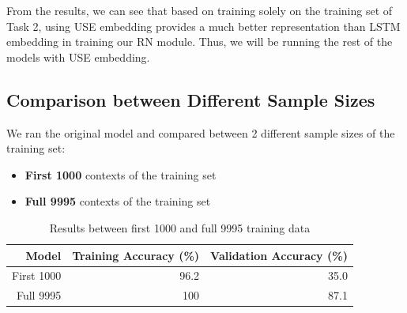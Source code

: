 \documentclass{article}
\begin{document}
From the results, we can see that based on training solely on the training set of Task 2, using USE embedding provides a much better representation than LSTM embedding in training our RN module. Thus, we will be running the rest of the models with USE embedding.

 

 

\subsection{Comparison between Different Sample Sizes}

 

 

We ran the original model and compared between 2 different sample sizes of the training set:

 

\begin{itemize}

\item  \textbf{First 1000} contexts of the training set

\item \textbf{Full 9995} contexts of the training set

\end{itemize}


\begin{table}[H] 

\begin{center}

\begin{tabular}{|r|r|r|}

 

\hline

\textbf{Model}&\textbf{Training Accuracy (\%)}&\textbf{Validation Accuracy (\%)}\\

\hline

First 1000 & 96.2 & 35.0\\

\hline

Full 9995 & 100 & 87.1\\

\hline

 

\end{tabular}
\label{tab:diffsamples}
\end{center}

\caption{Results between first 1000 and full 9995 training data}
\end{table} 
\end{document}
